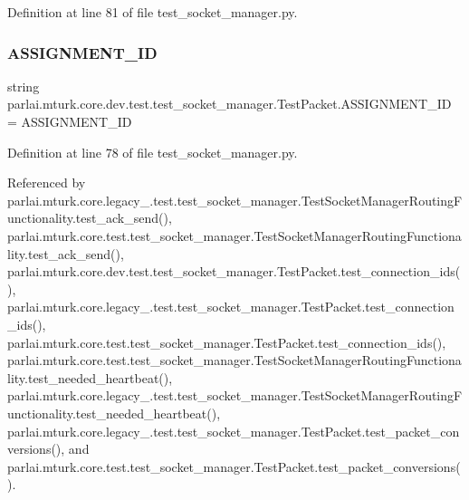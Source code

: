 Definition at line 81 of file test\+\_\+socket\+\_\+manager.\+py.

\mbox{\label{classparlai_1_1mturk_1_1core_1_1dev_1_1test_1_1test__socket__manager_1_1TestPacket_a3081f9fd5986fe422e717ee11749e2c2}} 
\subsubsection{\texorpdfstring{A\+S\+S\+I\+G\+N\+M\+E\+N\+T\+\_\+\+ID}{ASSIGNMENT\_ID}}
{\footnotesize\ttfamily string parlai.\+mturk.\+core.\+dev.\+test.\+test\+\_\+socket\+\_\+manager.\+Test\+Packet.\+A\+S\+S\+I\+G\+N\+M\+E\+N\+T\+\_\+\+ID = \textquotesingle{}A\+S\+S\+I\+G\+N\+M\+E\+N\+T\+\_\+\+ID\textquotesingle{}\hspace{0.3cm}{\ttfamily [static]}}



Definition at line 78 of file test\+\_\+socket\+\_\+manager.\+py.



Referenced by parlai.\+mturk.\+core.\+legacy\+\_.\+test.\+test\+\_\+socket\+\_\+manager.\+Test\+Socket\+Manager\+Routing\+Functionality.\+test\+\_\+ack\+\_\+send(), parlai.\+mturk.\+core.\+test.\+test\+\_\+socket\+\_\+manager.\+Test\+Socket\+Manager\+Routing\+Functionality.\+test\+\_\+ack\+\_\+send(), parlai.\+mturk.\+core.\+dev.\+test.\+test\+\_\+socket\+\_\+manager.\+Test\+Packet.\+test\+\_\+connection\+\_\+ids(), parlai.\+mturk.\+core.\+legacy\+\_.\+test.\+test\+\_\+socket\+\_\+manager.\+Test\+Packet.\+test\+\_\+connection\+\_\+ids(), parlai.\+mturk.\+core.\+test.\+test\+\_\+socket\+\_\+manager.\+Test\+Packet.\+test\+\_\+connection\+\_\+ids(), parlai.\+mturk.\+core.\+test.\+test\+\_\+socket\+\_\+manager.\+Test\+Socket\+Manager\+Routing\+Functionality.\+test\+\_\+needed\+\_\+heartbeat(), parlai.\+mturk.\+core.\+legacy\+\_.\+test.\+test\+\_\+socket\+\_\+manager.\+Test\+Socket\+Manager\+Routing\+Functionality.\+test\+\_\+needed\+\_\+heartbeat(), parlai.\+mturk.\+core.\+legacy\+\_.\+test.\+test\+\_\+socket\+\_\+manager.\+Test\+Packet.\+test\+\_\+packet\+\_\+conversions(), and parlai.\+mturk.\+core.\+test.\+test\+\_\+socket\+\_\+manager.\+Test\+Packet.\+test\+\_\+packet\+\_\+conversions().


